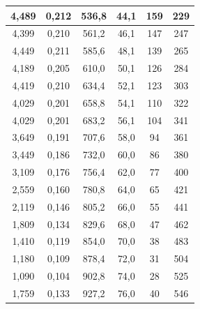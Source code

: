 \documentclass[a4paper,12pt]{report}
\begin{document}
\begin{table}[H]
\begin{tabular}{|c|c|c|c|c|c|}
4,489          & 0,212             & 536,8    & 44,1           & 159                                     & 229    \\ \hline
4,399          & 0,210             & 561,2    & 46,1           & 147                                     & 247    \\ \hline
4,449          & 0,211             & 585,6    & 48,1           & 139                                     & 265    \\ \hline
4,189          & 0,205             & 610,0    & 50,1           & 126                                     & 284    \\ \hline
4,419          & 0,210             & 634,4    & 52,1           & 123                                     & 303    \\ \hline
4,029          & 0,201             & 658,8    & 54,1           & 110                                     & 322    \\ \hline
4,029          & 0,201             & 683,2    & 56,1           & 104                                     & 341    \\ \hline
3,649          & 0,191             & 707,6    & 58,0           & 94                                      & 361    \\ \hline
3,449          & 0,186             & 732,0    & 60,0    & 86                                      & 380    \\ \hline
3,109          & 0,176             & 756,4    & 62,0    & 77                                      & 400    \\ \hline
2,559          & 0,160             & 780,8    & 64,0    & 65                                      & 421    \\ \hline
2,119          & 0,146             & 805,2    & 66,0    & 55                                      & 441    \\ \hline
1,809          & 0,134             & 829,6    & 68,0    & 47                                      & 462    \\ \hline
1,410          & 0,119             & 854,0    & 70,0    & 38                                      & 483    \\ \hline
1,180          & 0,109             & 878,4    & 72,0    & 31                                      & 504    \\ \hline
1,090          & 0,104             & 902,8    & 74,0    & 28                                      & 525    \\ \hline
1,759          & 0,133             & 927,2    & 76,0    & 40                                      & 546    \\ \hline

\end{tabular}
\end{table}
\end{document}
